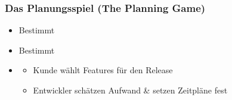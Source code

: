 \subsubsection*{Das Planungsspiel (The Planning Game)}
\begin{itemize}
    \item {} Bestimmt 
    \item {} Bestimmt 
    \item {}
    \begin{itemize}
        \item Kunde wählt Features für den Release
        \item Entwickler schätzen Aufwand \& setzen Zeitpläne fest
    \end{itemize}
\end{itemize}
